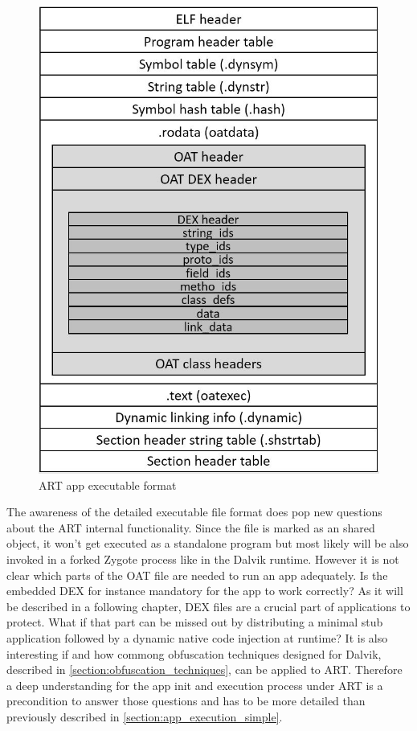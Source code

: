 \begin{figure}[htb]
  \centering
  \includegraphics[scale=0.5]{figures/andelf_format}
  \caption[ART app executable format]{ART app executable format}
  \label{fig:andelf_format}
\end{figure}

The awareness of the detailed executable file format does pop
new questions about the ART internal functionality.
Since the file is marked as an shared object, it won't get
executed as a standalone program but most likely will be also
invoked in a forked Zygote process like in the Dalvik runtime.
However it is not clear which parts of the OAT file are
needed to run an app adequately. Is the embedded DEX for instance
mandatory for the app to work correctly? As it will be described
in a following chapter, DEX files are
a crucial part of applications to protect. What if that part
can be missed out by distributing a minimal stub application
followed by a dynamic native code injection at runtime?
It is also interesting if and how commong obfuscation
techniques designed for Dalvik, described in \autoref{section:obfuscation_techniques}, can be applied to ART.
Therefore a deep understanding for the app init and execution
process under ART is a precondition to answer those
questions and has to be more detailed than previously described in
\autoref{section:app_execution_simple}.

